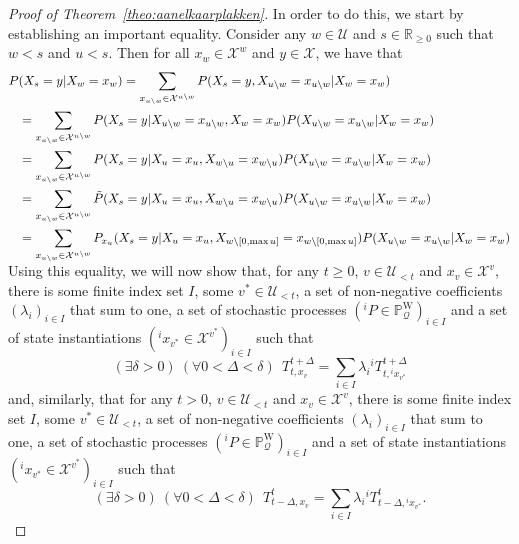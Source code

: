 \documentclass[10pt]{paper}
\theoremstyle{definition}
\newcommand{\reals}{\mathbb{R}}
\newcommand{\states}{\mathcal{X}}
\newcommand{\processes}{\mathbb{P}}
\newcommand{\wprocesses}{\processes^{\mathrm{W}}}
\newcommand{\rateset}{\mathcal{Q}}
\begin{document}
\begin{proof}[Proof of Theorem~\ref{theo:aanelkaarplakken}]
In order to do this, we start by establishing an important equality.
Consider any $w\in\mathcal{U}$ and $s\in\reals_{\geq0}$ such that $w<s$ and $u<s$. Then for all $x_w\in\states^w$ and $y\in\states$, we have that
\begin{align}\label{eq:theo:aanelkaarplakken:convexcombo}
P&(X_s=y\vert X_w=x_w)
=
\sum_{x_{u\setminus w}\in\states^{u\setminus w}}
P(X_s=y,
X_{u\setminus w}=x_{u\setminus w}
\vert X_w=x_w)\notag\\
&=
\sum_{x_{u\setminus w}\in\states^{u\setminus w}}
P(X_s=y\vert
X_{u\setminus w}=x_{u\setminus w}, X_w=x_w)
P(X_{u\setminus w}=x_{u\setminus w}
\vert X_w=x_w)\notag\\
&=
\sum_{x_{u\setminus w}\in\states^{u\setminus w}}
P(X_s=y\vert
X_{u}=x_{u}, X_{w\setminus u}=x_{w\setminus u})
P(X_{u\setminus w}=x_{u\setminus w}
\vert X_w=x_w)\notag\\
&=
\sum_{x_{u\setminus w}\in\states^{u\setminus w}}
\tilde{P}(X_s=y\vert
X_{u}=x_{u}, X_{w\setminus u}=x_{w\setminus u})
P(X_{u\setminus w}=x_{u\setminus w}
\vert X_w=x_w)\notag\\
&=
\sum_{x_{u\setminus w}\in\states^{u\setminus w}}
P_{x_u}(X_s=y\vert
X_{u}=x_{u}, X_{w\setminus [0,\max u]}=x_{w\setminus [0,\max u]})
P(X_{u\setminus w}=x_{u\setminus w}
\vert X_w=x_w)\notag\\[-3mm]
\end{align}
Using this equality, we will now show that, for any $t\geq0$, $v\in\mathcal{U}_{<t}$ and $x_v\in\states^v$, there is some finite index set $I$, some $v^*\in\mathcal{U}_{<t}$, a set of non-negative coefficients $(\lambda_i)_{i\in I}$ that sum to one, a set of stochastic processes $({}^iP\in\wprocesses_\rateset)_{i\in I}$ and a set of state instantiations $({}^ix_{v^*}\in\states^{v^*})_{i\in I}$ such that
\begin{equation}\label{eq:theo:aanelkaarplakken:convexTright}
(\exists \delta>0)~(\forall 0<\Delta<\delta)~~
T_{t,x_v}^{t+\Delta}
=\sum_{i\in I}\lambda_i
{}^iT_{t,{}^ix_{v^*}}^{t+\Delta}
\end{equation}
and, similarly, that for any $t>0$, $v\in\mathcal{U}_{<t}$ and $x_v\in\states^v$, there is some finite index set $I$, some $v^*\in\mathcal{U}_{<t}$, a set of non-negative coefficients $(\lambda_i)_{i\in I}$ that sum to one, a set of stochastic processes $({}^iP\in\wprocesses_\rateset)_{i\in I}$ and a set of state instantiations $({}^ix_{v^*}\in\states^{v^*})_{i\in I}$ such that
\begin{equation}\label{eq:theo:aanelkaarplakken:convexTleft}
(\exists \delta>0)~(\forall 0<\Delta<\delta)~~
T_{t-\Delta,x_v}^{t}
=\sum_{i\in I}\lambda_i
{}^iT_{t-\Delta,{}^ix_{v^*}}^{t}.
\end{equation}


\end{proof}
\end{document}
